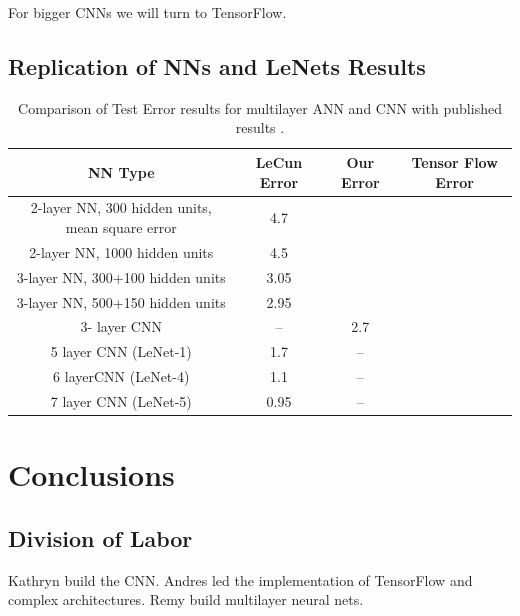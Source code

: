 \documentclass[12pt, twocolumn]{article}
\begin{document}
For bigger CNNs we will turn to TensorFlow. 
\subsection{Replication of NNs and LeNets Results}





\begin{center}
\begin{table}[t]
\begin{tabular} { |c | c | c | c | }
    \hline
    NN Type & LeCun Error  &  Our Error  & Tensor Flow Error \\ \hline
    2-layer NN, 300 hidden units, mean square error & 4.7 &  & \\ \hline
    2-layer NN, 1000 hidden units & 4.5 & & \\ \hline
    3-layer NN, 300+100 hidden units & 3.05 & &  \\ \hline
    3-layer NN, 500+150 hidden units & 2.95 & & \\ \hline
    3- layer CNN &  -- &  2.7 &  \\ \hline
    5 layer CNN  (LeNet-1) & 1.7 & -- & \\ \hline 
    6 layerCNN (LeNet-4) & 1.1& -- & \\ \hline 
    7 layer CNN (LeNet-5) &  0.95 &  -- &\\ \hline
\end{tabular}
\label{table: MNISTLeCun}
\caption{Comparison of Test Error results for multilayer ANN and CNN with published results \cite{LeCun1998}.}
\end{table}
\end{center}



\section{Conclusions}

\subsection{Division of Labor}
Kathryn build the CNN. 
Andres led the implementation of TensorFlow and complex architectures.
Remy build multilayer neural nets. 



 
\end{document}
